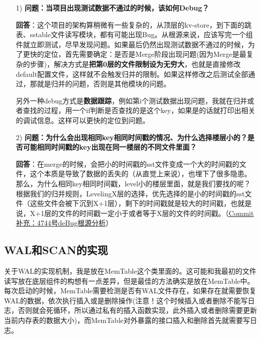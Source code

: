 \documentclass[fontset=windows]{article}
\begin{document}
\begin{itemize}
    \item [1)] \textbf{问题：当项目出现测试数据不通过的时候，该如何Debug？}
    
    \textbf{回答}：这个项目的架构算稍微有一些复杂的，从顶层的kv-store，到下面的跳表、sstable文件读写模块，都有可能出现Bug。从根源来说，应该写完一个组件就立即测试，尽早发现问题。如果最后仍然出现测试数据不通过的时候，为了更快的定位，首先需要确定：是否是Merge阶段出现问题(因为Merge是最复杂的步骤)，解决方式是\textbf{把第0层的文件限制设为无穷大}，也就是直接修改default配置文件，这样就不会触发归并的限制。如果这样修改之后测试全部通过，那就是归并的问题，否则是其他模块的问题。
    
    另外一种debug方式是\textbf{数据跟踪}，例如第i个测试数据出现问题，我就在归并或者查找的过程，用一个if判断是否查找的是这个key，如果是的话就打印出相关的调试信息。这样可以更快的定位到问题。
    
    \item [2)] \textbf{问题：为什么会出现相同key相同时间戳的情况、为什么选择楼层小的？是否可能相同时间戳的key出现在同一楼层的不同文件里面？}
    
    \textbf{回答}：在merge的时候，会把小的时间戳的sst文件变成一个大的时间戳的文件，这个本质是导致了数据的丢失的（从直觉上来说），也埋下了很多隐患。那么，为什么相同key相同时间戳，level小的楼层里面，就是我们要找的呢？根据我们的归并规则，LevelingX层的选择，优先选择的是小的时间戳的sst文件（这些文件会被下沉到X+1层），剩下的时间戳就是较大的时间戳，也就是说，X+1层的文件的时间戳一定小于或者等于X层的文件的时间戳。（\href{https://github.com/Musicminion/2022-2023-2-Advanced-Data-Structure/commit/63726308274f04282bbb7ae7b08928f4a87f2263#commitcomment-104586158}{\underline{Commit补充：4744号deBug根源分析}}）

\end{itemize}

\subsection{WAL和SCAN的实现}

关于WAL的实现机制，我是放在MemTable这个类里面的。这可能和我最初的文件读写放在底层组件的构想有一点差异，但是最佳的方法确实是放在MemTable中。每次启动的时候，MemTable需要检测是否有WAL文件存在，如果存在就需要恢复WAL的数据，依次执行插入或是删除操作(注意！这个时候插入或者删除不能写日志，否则就会死循环，所以通过私有的插入函数实现，此外插入或者删除需要更新当前内存表的数据大小)，而MemTable对外暴露的接口插入和删除首先就需要写日志。
\end{document}
